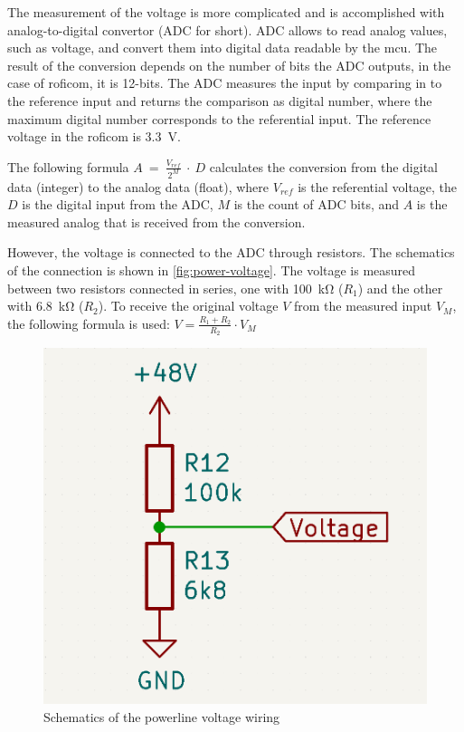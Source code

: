 \documentclass[
  digital,     %
  oneside,     %
  nosansbold,  %
  nocolorbold, %
  nolof,         %
  nolot,         %
]{fithesis4}
\begin{document}
The measurement of the voltage is more complicated and is accomplished with analog-to-digital
convertor (ADC for short). ADC allows to read analog values, such as voltage, and convert them into
digital data readable by the \acrshort{mcu}. The result of the conversion depends on the number of
bits the ADC outputs, in the case of \acrshort{roficom}, it is 12-bits. The ADC measures the input
by comparing in to the reference input and returns the comparison as digital number, where the
maximum digital number corresponds to the referential input. The reference voltage in the
\acrshort{roficom} is \qty{3.3}{\volt}.

The following formula $A~=~\frac{V_{ref}}{2^{M}}~\cdot~D$ calculates the conversion from the digital
data (integer) to the analog data (float), where $V_{ref}$ is the referential voltage, the $D$ is
the digital input from the ADC, $M$ is the count of ADC bits, and $A$ is the measured analog that is
received from the conversion.

However, the voltage is connected to the ADC through resistors. The schematics of the connection is
shown in \autoref{fig:power-voltage}. The voltage is measured between two resistors connected in
series, one with \qty{100}{\kilo\ohm} ($R_1$) and the other with \qty{6.8}{\kilo\ohm} ($R_2$). To
receive the original voltage $V$ from the measured input $V_M$, the following formula is used: $V =
\frac{R_1 + R_2}{R_2} \cdot V_{M}$

\begin{figure}
    \includegraphics[scale=0.2,keepaspectratio]{assets/power-voltage.png}
    \caption{ Schematics of the powerline voltage wiring }
    \label{fig:power-voltage}
\end{figure}
\end{document}
